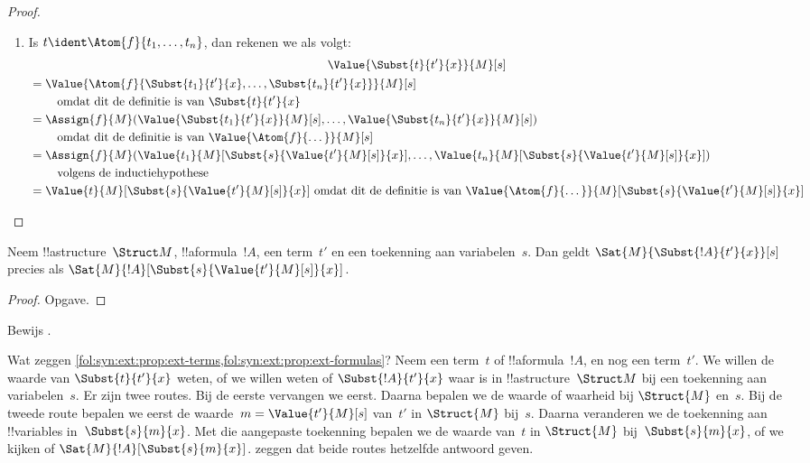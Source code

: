\documentclass[../../../include/open-logic-section]{subfiles}
\begin{document}
\begin{proof}
\begin{enumerate}
\item Is $t \ident \Atom{f}{t_1,\dots,t_n}$, dan rekenen we als volgt:
\begin{multline*}
  \Value{\Subst{t}{t'}{x}}{M}[s] \\
  \begin{aligned}[b]
& = \Value{\Atom{f}{\Subst{t_1}{t'}{x}, \dots, \Subst{t_n}{t'}{x}}}{M}[s]\\
& \qquad    \text{ omdat dit de definitie is van $\Subst{t}{t'}{x}$}\\
& = \Assign{f}{M}(\Value{\Subst{t_1}{t'}{x}}{M}[s], \dots,
    \Value{\Subst{t_n}{t'}{x}}{M}[s])\\
    & \qquad  \text{ omdat dit de definitie is van $\Value{\Atom{f}{\dots}}{M}[s]$}\\
& = \Assign{f}{M}(\Value{t_1}{M}[\Subst{s}{\Value{t'}{M}[s]}{x}], \dots,
   \Value{t_n}{M}[\Subst{s}{\Value{t'}{M}[s]}{x}])\\
& \qquad    \text{ volgens de inductiehypothese}\\
& = \Value{t}{M}[\Subst{s}{\Value{t'}{M}[s]}{x}]
    \text{ omdat dit de definitie is van $\Value{\Atom{f}{\dots}}{M}[\Subst{s}{\Value{t'}{M}[s]}{x}]$}
  \end{aligned}
\end{multline*}
\end{enumerate}
\end{proof}

\begin{prop} Neem !!a{structure}~$\Struct M$,
!!a{formula}~$!A$, een term~$t'$ en een toekenning aan variabelen~$s$.
Dan geldt $\Sat{M}{\Subst{!A}{t'}{x}}[s]$ precies als
$\Sat{M}{!A}[\Subst{s}{\Value{t'}{M}[s]}{x}]$.
\end{prop}

\begin{proof}
Opgave.
\end{proof}

\begin{prob}
Bewijs .
\end{prob}

\begin{explain}
  Wat zeggen
  \cref{fol:syn:ext:prop:ext-terms,fol:syn:ext:prop:ext-formulas}?
  Neem een term~$t$ of !!a{formula}~$!A$, en nog een term~$t'$.
  We willen de waarde van $\Subst{t}{t'}{x}$ weten, of we willen
  weten of $\Subst{!A}{t'}{x}$ waar is in !!a{structure}~$\Struct M$
  bij een toekenning aan variabelen~$s$. Er zijn twee routes. Bij de
  eerste vervangen we eerst. Daarna bepalen we de waarde of waarheid
  bij $\Struct{M}$ en~$s$. Bij de tweede route bepalen we eerst de
  waarde~$m = \Value{t'}{M}[s]$ van~$t'$ in
  $\Struct{M}$ bij~$s$. Daarna veranderen we de toekenning aan
  !!{variable}s in~$\Subst{s}{m}{x}$. Met die aangepaste toekenning
  bepalen we de waarde van~$t$ in $\Struct{M}$ bij~$\Subst{s}{m}{x}$,
  of we kijken of $\Sat{M}{!A}[\Subst{s}{m}{x}]$.
  zeggen dat beide routes hetzelfde antwoord geven.
\end{explain}
\end{document}

